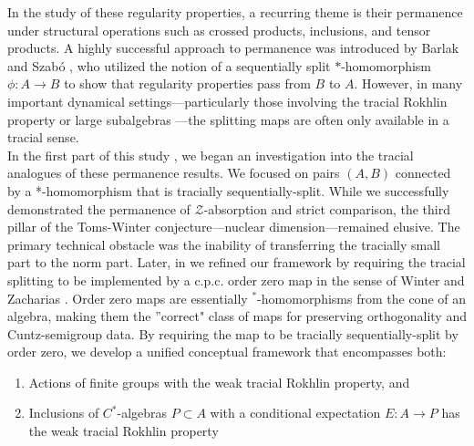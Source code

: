 \documentclass[12pt]{amsart}
\theoremstyle{plain}
\theoremstyle{definition}
\numberwithin{equation}{section}
\begin{document}
\noindent 
In the study of these regularity properties, a recurring theme is their permanence under structural operations such as crossed products, inclusions, and tensor products. A highly successful approach to permanence was introduced by Barlak and Szabó \cite{BS}, who utilized the notion of a sequentially split $*$-homomorphism $\phi: A \to B$ to show that regularity properties pass from $B$ to $A$. However, in many important dynamical settings—particularly those involving the tracial Rokhlin property or large subalgebras \cite{P}—the splitting maps are often only available in a tracial sense.\\ 

\noindent
In the first part of this study \cite{LO}, we began an investigation into the tracial analogues of these permanence results. We focused on pairs $(A, B)$ connected by a *-homomorphism that is tracially sequentially-split. While we successfully demonstrated the permanence of $\mathcal{Z}$-absorption and strict comparison, the third pillar of the Toms-Winter conjecture—nuclear dimension—remained elusive. The primary technical obstacle was the inability of transferring the tracially small part to the norm part.  Later,  in \cite{LO1} we refined our framework by requiring the tracial splitting to be implemented by a c.p.c. order zero map in the sense of Winter and Zacharias \cite{WZ}. Order zero maps are essentially $^*$-homomorphisms from the cone of an algebra, making them the ''correct" class of maps for preserving orthogonality and Cuntz-semigroup data. By requiring the map to be tracially sequentially-split by order zero, we develop a unified conceptual framework that encompasses both:
\begin{enumerate}
\item Actions of finite groups with the weak tracial Rokhlin property, and
\item Inclusions of $C^*$-algebras $P \subset A$ with a conditional expectation $E: A \to P$ has the weak tracial Rokhlin property
\end{enumerate}
\medskip
\end{document}
